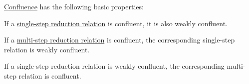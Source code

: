\begin{proposition}\label{thm:def:reduction_confluence}
  \hyperref[def:reduction_confluence]{Confluence} has the following basic properties:
  \begin{thmenum}
     If a \hyperref[def:lambda_reduction/single]{single-step reduction relation} is confluent, it is also weakly confluent.

     If a \hyperref[def:lambda_reduction/single]{multi-step reduction relation} is confluent, the corresponding single-step relation is weakly confluent.

     If a single-step reduction relation is weakly confluent, the corresponding multi-step relation is confluent.
  \end{thmenum}
\end{proposition}
